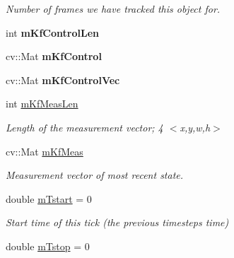 \begin{DoxyCompactItemize}
\begin{DoxyCompactList}\small\item\em Number of frames we have tracked this object for. \end{DoxyCompactList}\item 
int {\bfseries m\+Kf\+Control\+Len}\hypertarget{classTrackingFilter_a063a1ce0b4e9dd93f7d5d7bc184f8032}{}\label{classTrackingFilter_a063a1ce0b4e9dd93f7d5d7bc184f8032}

\item 
cv\+::\+Mat {\bfseries m\+Kf\+Control}\hypertarget{classTrackingFilter_a3e247787cfc92a4b44c61bb72d204e5b}{}\label{classTrackingFilter_a3e247787cfc92a4b44c61bb72d204e5b}

\item 
cv\+::\+Mat {\bfseries m\+Kf\+Control\+Vec}\hypertarget{classTrackingFilter_a55dc676fa1368732fdd96d0e9cba770a}{}\label{classTrackingFilter_a55dc676fa1368732fdd96d0e9cba770a}

\item 
int \hyperlink{classTrackingFilter_a62f51f323019f3aa0b5d405092f68da4}{m\+Kf\+Meas\+Len}\hypertarget{classTrackingFilter_a62f51f323019f3aa0b5d405092f68da4}{}\label{classTrackingFilter_a62f51f323019f3aa0b5d405092f68da4}

\begin{DoxyCompactList}\small\item\em Length of the measurement vector; 4 $<$x,y,w,h$>$ \end{DoxyCompactList}\item 
cv\+::\+Mat \hyperlink{classTrackingFilter_aa0d5d0cde0fec707074a75bfc1848700}{m\+Kf\+Meas}\hypertarget{classTrackingFilter_aa0d5d0cde0fec707074a75bfc1848700}{}\label{classTrackingFilter_aa0d5d0cde0fec707074a75bfc1848700}

\begin{DoxyCompactList}\small\item\em Measurement vector of most recent state. \end{DoxyCompactList}\item 
double \hyperlink{classTrackingFilter_af2cebac2ba07096f7488487e3d6f1a55}{m\+Tstart} = 0\hypertarget{classTrackingFilter_af2cebac2ba07096f7488487e3d6f1a55}{}\label{classTrackingFilter_af2cebac2ba07096f7488487e3d6f1a55}

\begin{DoxyCompactList}\small\item\em Start time of this tick (the previous timestep\textquotesingle{}s time) \end{DoxyCompactList}\item 
double \hyperlink{classTrackingFilter_add279c6d213b92200de43faa6f3f8862}{m\+Tstop} = 0\hypertarget{classTrackingFilter_add279c6d213b92200de43faa6f3f8862}{}\label{classTrackingFilter_add279c6d213b92200de43faa6f3f8862}


\end{DoxyCompactItemize}
